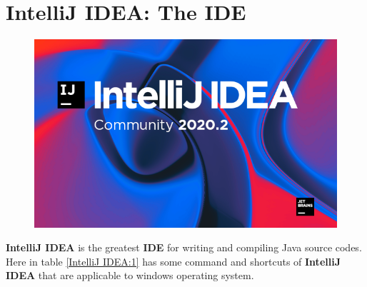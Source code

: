 \documentclass[10 pt]{book}
\begin{document}
\section{IntelliJ IDEA: The IDE} %
\begin{figure}
	\includegraphics[width = 0.9\linewidth]{IntelliJ IDEA user interface.png}
\end{figure}

\textbf{IntelliJ IDEA} is the greatest \textbf{IDE} for writing and compiling Java source codes. Here in table \ref{IntelliJ IDEA:1} has some command and shortcuts of \textbf{IntelliJ IDEA} that are applicable to windows operating system.
\end{document}

